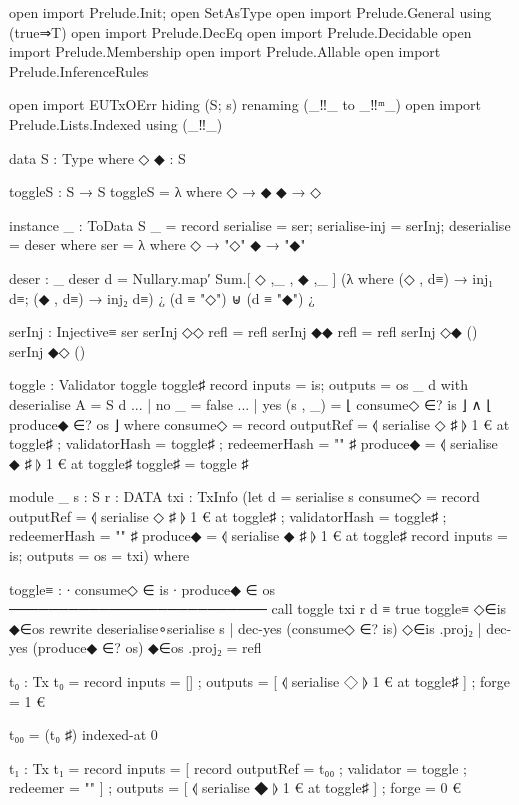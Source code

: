 open import Prelude.Init; open SetAsType
open import Prelude.General using (true⇒T)
open import Prelude.DecEq
open import Prelude.Decidable
open import Prelude.Membership
open import Prelude.Allable
open import Prelude.InferenceRules

open import EUTxOErr
  hiding (S; s)
  renaming (_‼_ to _‼ᵐ_)
open import Prelude.Lists.Indexed using (_‼_)

data S : Type where
  ◇ ◆ : S

toggleS : S → S
toggleS = λ where
  ◇ → ◆
  ◆ → ◇

instance
  _ : ToData S
  _ = record {serialise = ser; serialise-inj = serInj; deserialise = deser}
    where
    ser = λ where
      ◇ → "◇"
      ◆ → "◆"

    deser : _
    deser d =
      Nullary.map′
        Sum.[ ◇ ,_ , ◆ ,_ ]
        (λ where (◇ , d≡) → inj₁ d≡; (◆ , d≡) → inj₂ d≡)
        ¿ (d ≡ "◇") ⊎ (d ≡ "◆") ¿

    serInj : Injective≡ ser
    serInj {◇}{◇} refl = refl
    serInj {◆}{◆} refl = refl
    serInj {◇}{◆} ()
    serInj {◆}{◇} ()

toggle : Validator
toggle toggle♯ record {inputs = is; outputs = os} _ d
  with deserialise {A = S} d
... | no _ = false
... | yes (s , _) = ⌊ consume◇ ∈? is ⌋ ∧ ⌊ produce◆ ∈? os ⌋
  where
    consume◇ = record
      { outputRef = ⦉ serialise ◇ ♯ ⦊ 1 € at toggle♯
      ; validatorHash = toggle♯
      ; redeemerHash = "" ♯ }
    produce◆ = ⦉ serialise ◆ ♯ ⦊ 1 € at toggle♯
toggle♯ = toggle ♯

module _
  {s : S}
  {r : DATA}
  {txi : TxInfo}
  (let d = serialise s
       consume◇ = record
         { outputRef = ⦉ serialise ◇ ♯ ⦊ 1 € at toggle♯
         ; validatorHash = toggle♯
         ; redeemerHash = "" ♯ }
       produce◆ = ⦉ serialise ◆ ♯ ⦊ 1 € at toggle♯
       record {inputs = is; outputs = os} = txi)
  where

  toggle≡ :
    ∙ consume◇ ∈ is
    ∙ produce◆ ∈ os
      ──────────────────────────
      call toggle txi r d ≡ true
  toggle≡ ◇∈is ◆∈os
    rewrite deserialise∘serialise s
          | dec-yes (consume◇ ∈? is) ◇∈is .proj₂
          | dec-yes (produce◆ ∈? os) ◆∈os .proj₂
          = refl

t₀ : Tx
t₀ = record
  { inputs = []
  ; outputs = [ ⦉ serialise ◇ ⦊ 1 € at toggle♯ ]
  ; forge = 1 € }

t₀₀ = (t₀ ♯) indexed-at 0

t₁ : Tx
t₁ = record
  { inputs  = [ record { outputRef = t₀₀ ; validator = toggle ; redeemer = "" } ]
  ; outputs = [ ⦉ serialise ◆ ⦊ 1 € at toggle♯ ]
  ; forge   = 0 € }


